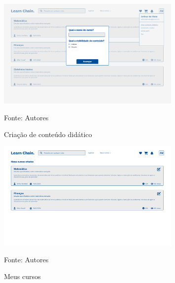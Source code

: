 \begin{apendicesenv}
    \begin{figure}[h]
        \centering
        \caption{Criação de conteúdo didático}
        \includegraphics[width=0.8\textwidth]{figuras/Criar_conteudo_didatico.png}
        \begin{center}
            {\footnotesize Fonte: Autores}
        \end{center}
        \label{fig:Criar_conteudo_didatico}
    \end{figure}

    \begin{figure}[h]
        \centering
        \caption{Meus cursos}
        \includegraphics[width=0.8\textwidth]{figuras/meus_cursos.png}
        \begin{center}
            {\footnotesize Fonte: Autores}
        \end{center}
        \label{fig:meus_cursos}
    \end{figure}


\end{apendicesenv}
